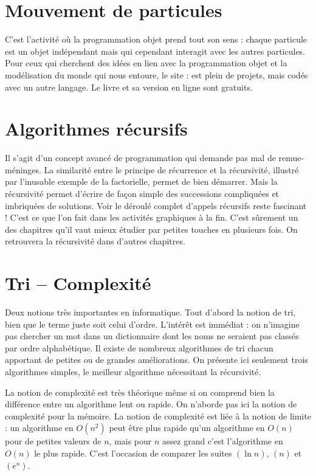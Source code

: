 \documentclass[11pt,class=report,crop=false]{standalone}
\begin{document}
\section{Mouvement de particules}

C'est l'activité où la programmation objet prend tout son sens : chaque particule est un objet indépendant mais qui cependant interagit avec les autres particules.
Pour ceux qui cherchent des idées en lien avec la programmation objet et la modélisation du monde qui nous entoure, le site :
est plein de projets, mais codés avec un autre langage. Le livre et sa version en ligne sont gratuits.  


\section{Algorithmes récursifs}

Il s'agit d'un concept avancé de programmation qui demande pas mal de remue-méninges. La similarité entre le principe de récurrence et la récursivité, illustré par l'inusable exemple de la factorielle, permet de bien démarrer. Mais la récursivité permet d'écrire de façon simple des successions compliquées et imbriquées de solutions. Voir le déroulé complet d'appels récursifs reste fascinant ! C'est ce que l'on fait dans les activités graphiques à la fin. C'est sûrement un des chapitres qu'il vaut mieux étudier par petites touches en plusieurs fois. On retrouvera la récursivité dans d'autres chapitres. 


\section{Tri -- Complexité}

Deux notions très importantes en informatique. Tout d'abord la notion de tri, bien que le terme juste soit celui d'ordre. L'intérêt est immédiat : on n'imagine pas chercher un mot dans un dictionnaire dont les noms ne seraient pas classés par ordre alphabétique. Il existe de nombreux algorithmes de tri chacun apportant de petites ou de grandes améliorations. On présente ici seulement trois algorithmes simples, le meilleur algorithme nécessitant la récursivité.

La notion de complexité est très théorique même si on comprend bien la différence entre un algorithme lent ou rapide. On n'aborde pas ici la notion de complexité pour la mémoire. La notion de complexité est liée à la notion de limite : un algorithme en $O(n^2)$ peut être plus rapide qu'un algorithme en $O(n)$ pour de petites valeurs de $n$, mais pour $n$ \og{}assez grand\fg{} c'est l'algorithme en $O(n)$ le plus rapide. C'est l'occasion de comparer les suites $(\ln n)$, $(n)$ et $(e^n)$.
\end{document}
